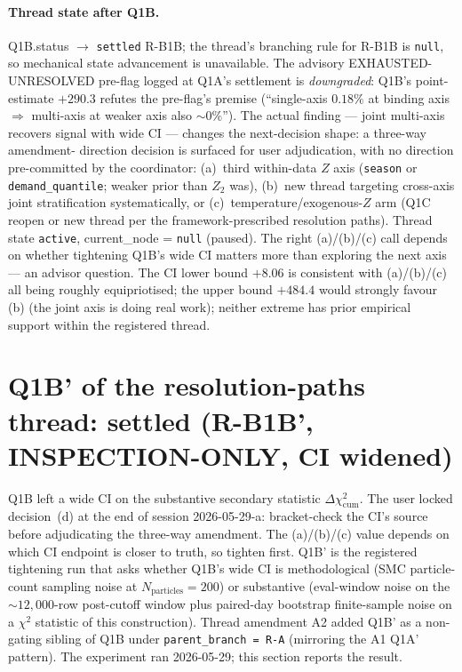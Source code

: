 \documentclass[11pt]{article}
\theoremstyle{definition}
\theoremstyle{plain}
\begin{document}
\paragraph{Thread state after Q1B.}
Q1B.status $\to$ \texttt{settled} R-B1B; the thread's branching
rule for R-B1B is \texttt{null}, so mechanical state advancement
is unavailable. The advisory EXHAUSTED-UNRESOLVED pre-flag logged
at Q1A's settlement is \emph{downgraded}: Q1B's point-estimate
$+290.3$ refutes the pre-flag's premise (``single-axis $0.18\%$ at
binding axis $\Rightarrow$ multi-axis at weaker axis also $\sim 0\%$'').
The actual finding --- joint multi-axis recovers signal with wide
CI --- changes the next-decision shape: a three-way amendment-
direction decision is surfaced for user adjudication, with no
direction pre-committed by the coordinator: (a)~third within-data
$Z$ axis (\texttt{season} or \texttt{demand\_quantile}; weaker
prior than $Z_2$ was), (b)~new thread targeting cross-axis joint
stratification systematically, or (c)~temperature/exogenous-$Z$
arm (Q1C reopen or new thread per the framework-prescribed
resolution paths). Thread state \texttt{active}, current\_node =
\texttt{null} (paused). The right (a)/(b)/(c) call depends on
whether tightening Q1B's wide CI matters more than exploring the
next axis --- an advisor question. The CI lower bound $+8.06$ is
consistent with (a)/(b)/(c) all being roughly equipriotised; the
upper bound $+484.4$ would strongly favour (b) (the joint axis is
doing real work); neither extreme has prior empirical support
within the registered thread.

\section{Q1B' of the resolution-paths thread: settled (R-B1B', INSPECTION-ONLY, CI widened)}
\label{sec:q1b-prime-settled}

Q1B left a wide CI on the substantive secondary statistic
$\Delta\chi^2_{\mathrm{cum}}$. The user locked decision~(d) at
the end of session 2026-05-29-a: bracket-check the CI's source
before adjudicating the three-way amendment. The (a)/(b)/(c)
value depends on which CI endpoint is closer to truth, so tighten
first. Q1B' is the registered tightening run that asks whether
Q1B's wide CI is methodological (SMC particle-count sampling noise
at $N_{\mathrm{particles}} = 200$) or substantive (eval-window noise
on the $\sim 12{,}000$-row post-cutoff window plus paired-day
bootstrap finite-sample noise on a $\chi^2$ statistic of this
construction). Thread amendment A2 added Q1B' as a non-gating
sibling of Q1B under \verb|parent_branch = R-A| (mirroring the
A1 Q1A' pattern). The experiment ran 2026-05-29; this section
reports the result.
\end{document}
